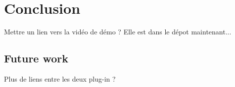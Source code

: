 \section{Conclusion}

Mettre un lien vers la vidéo de démo ? Elle est dans le dépot maintenant...

\subsection{Future work}

Plus de liens entre les deux plug-in ?
